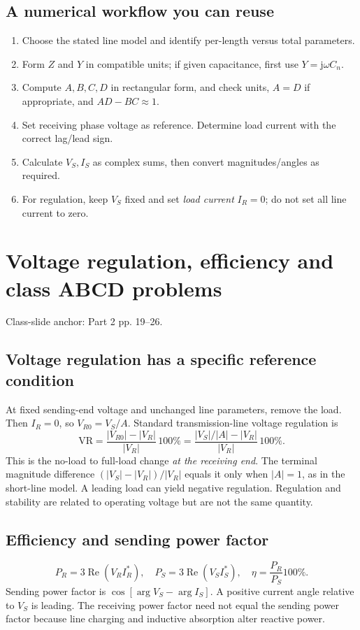 \documentclass[11pt,a4paper]{article}
\newcommand{\slides}[1]{{\small\color{muted}\textsf{Class-slide anchor: #1.}}\par}
\newcommand{\chapterstart}[2]{\clearpage\section{#1}\label{#2}}
\newcommand{\ans}[1]{\boxed{#1}}
\newcommand{\jj}{\mathrm j}
\begin{document}
\subsection{A numerical workflow you can reuse}
\begin{enumerate}
\item Choose the stated line model and identify per-length versus total parameters.
\item Form $Z$ and $Y$ in compatible units; if given capacitance, first use $Y=\jj\omega C_n$.
\item Compute $A,B,C,D$ in rectangular form, and check units, $A=D$ if appropriate, and $AD-BC\approx1$.
\item Set receiving phase voltage as reference. Determine load current with the correct lag/lead sign.
\item Calculate $V_S,I_S$ as complex sums, then convert magnitudes/angles as required.
\item For regulation, keep $V_S$ fixed and set \emph{load current} $I_R=0$; do not set all line current to zero.
\end{enumerate}

\chapterstart{Voltage regulation, efficiency and class ABCD problems}{performance}
\slides{Part 2 pp. 19--26}
\subsection{Voltage regulation has a specific reference condition}
At fixed sending-end voltage and unchanged line parameters, remove the load. Then $I_R=0$, so $V_{R0}=V_S/A$. Standard transmission-line voltage regulation is
\[
 \ans{\mathrm{VR}=\frac{|V_{R0}|-|V_R|}{|V_R|}\,100\%}
 =\frac{|V_S|/|A|-|V_R|}{|V_R|}\,100\%.
\]
This is the no-load to full-load change \emph{at the receiving end}. The terminal magnitude difference $(|V_S|-|V_R|)/|V_R|$ equals it only when $|A|=1$, as in the short-line model. A leading load can yield negative regulation. Regulation and stability are related to operating voltage but are not the same quantity.
\subsection{Efficiency and sending power factor}
\[
 P_R=3\operatorname{Re}(V_RI_R^*),\quad
 P_S=3\operatorname{Re}(V_SI_S^*),\quad
 \ans{\eta=\frac{P_R}{P_S}100\%}.
\]
Sending power factor is $\cos[\arg V_S-\arg I_S]$. A positive current angle relative to $V_S$ is leading. The receiving power factor need not equal the sending power factor because line charging and inductive absorption alter reactive power.
\end{document}

